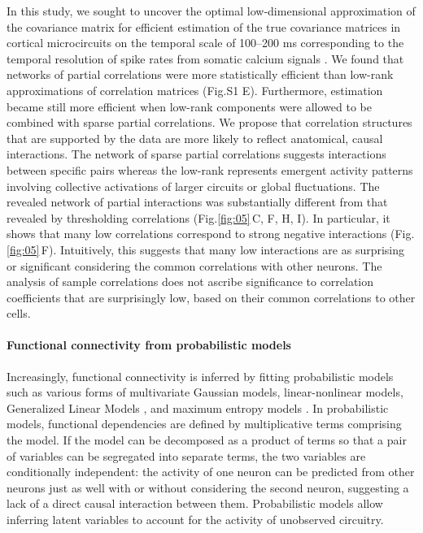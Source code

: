 \documentclass[10pt]{article}
\newcommand{\figref}[2]{Fig.\;\ref{fig:#1}\,#2}
\begin{document}
In this study, we sought to uncover the optimal low-dimensional approximation of the covariance matrix for efficient estimation of the true covariance matrices in cortical microcircuits on the temporal scale of 100--200 ms corresponding to the temporal resolution of spike rates from somatic calcium signals \cite{Cotton:2013}.  We found that networks of partial correlations were more statistically efficient than low-rank approximations of correlation matrices (Fig.\;S1 E). Furthermore, estimation became still more efficient when low-rank components were allowed to be combined with sparse partial correlations. We propose that correlation structures that are supported by the data  are more likely to reflect anatomical, causal interactions. The network of sparse partial correlations suggests interactions between specific pairs whereas the low-rank represents emergent activity patterns involving collective activations of larger circuits or global fluctuations. The revealed network of partial interactions was substantially different from that revealed by thresholding correlations (\figref{05}{C, F, H, I}). In particular, it shows that many low correlations correspond to strong negative interactions (\figref{05}{F}). Intuitively, this suggests that many low interactions are as surprising or significant considering the common correlations with other neurons. The analysis of sample correlations does not ascribe significance to correlation coefficients that are surprisingly low, based on their common correlations to other cells.


\paragraph{Functional connectivity from probabilistic models}
Increasingly, functional connectivity is inferred by fitting probabilistic models such as various forms of multivariate Gaussian models, linear-nonlinear models, Generalized Linear Models \cite{Pillow:2008}, and maximum entropy models \cite{Schneidman:2006, Tkacik:2006, Tang:2008, Shlens:2009}. In probabilistic models, functional dependencies are defined by multiplicative terms comprising the model. If the model can be decomposed as a product of terms so that a pair of variables can be segregated into separate terms, the two variables are conditionally independent: the activity of one neuron can be predicted from other neurons just as well with or without considering the second neuron, suggesting a lack of a direct causal interaction between them. Probabilistic models allow inferring latent variables to account for the activity of unobserved circuitry.
\end{document}
